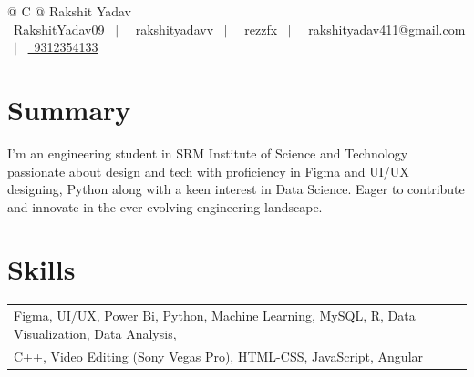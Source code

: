 \documentclass[a4paper,12pt]{article}
\begin{document}
\pagestyle{empty} 



\begin{tabularx}{\linewidth}{@{} C @{}}
\Huge{Rakshit Yadav} \\[7.5pt]
\href{https://github.com/RakshitYadav09}{\raisebox{-0.05\height}\faGithub\ RakshitYadav09} \ $|$ \ 
\href{https://www.linkedin.com/in/rakshityadavv/}{\raisebox{-0.05\height}\faLinkedin\ rakshityadavv} \ $|$ \ 
\href{https://www.behance.net/rezzfx}{\raisebox{-0.05\height}\faGlobe \ rezzfx} \ $|$ \ 
\href{mailto:rakshityadav411@gmail.com}{\raisebox{-0.05\height}\faEnvelope \ rakshityadav411@gmail.com} \ $|$ \ 
\href{tel:9312354133}{\raisebox{-0.05\height}\faMobile \ 9312354133} \\
\end{tabularx}


\section{Summary}
I'm an engineering student in SRM Institute of Science and Technology passionate about design and tech with proficiency in Figma and UI/UX designing, Python along with a keen interest in Data Science. Eager to contribute and innovate in the ever-evolving engineering landscape.

\section{Skills}
\begin{tabularx}{\linewidth}{@{}l X@{}}
Figma, UI/UX, Power Bi, Python, Machine Learning, MySQL, R, Data Visualization, Data Analysis,\\ C++,
Video Editing (Sony Vegas Pro), HTML-CSS, JavaScript, Angular 
\end{tabularx}
\end{document}
